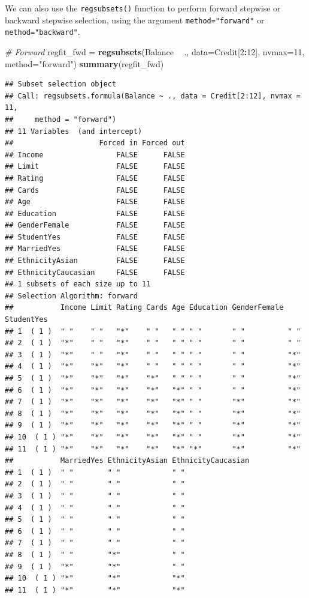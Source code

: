 \documentclass[
]{article}
\newenvironment{Shaded}{\begin{snugshade}}{\end{snugshade}}
\newcommand{\CommentTok}[1]{\textcolor[rgb]{0.56,0.35,0.01}{\textit{#1}}}
\newcommand{\DataTypeTok}[1]{\textcolor[rgb]{0.13,0.29,0.53}{#1}}
\newcommand{\DecValTok}[1]{\textcolor[rgb]{0.00,0.00,0.81}{#1}}
\newcommand{\KeywordTok}[1]{\textcolor[rgb]{0.13,0.29,0.53}{\textbf{#1}}}
\newcommand{\NormalTok}[1]{#1}
\newcommand{\OperatorTok}[1]{\textcolor[rgb]{0.81,0.36,0.00}{\textbf{#1}}}
\newcommand{\StringTok}[1]{\textcolor[rgb]{0.31,0.60,0.02}{#1}}
\begin{document}
We can also use the \texttt{regsubsets()} function to perform forward
stepwise or backward stepwise selection, using the argument
\texttt{method="forward"} or \texttt{method="backward"}.

\begin{Shaded}
\begin{Highlighting}[]
\CommentTok{# Forward}
\NormalTok{regfit_fwd =}\StringTok{ }\KeywordTok{regsubsets}\NormalTok{(Balance }\OperatorTok{~}\StringTok{ }\NormalTok{., }\DataTypeTok{data=}\NormalTok{Credit[}\DecValTok{2}\OperatorTok{:}\DecValTok{12}\NormalTok{], }\DataTypeTok{nvmax=}\DecValTok{11}\NormalTok{, }\DataTypeTok{method=}\StringTok{"forward"}\NormalTok{)}
\KeywordTok{summary}\NormalTok{(regfit_fwd)}
\end{Highlighting}
\end{Shaded}

\begin{verbatim}
## Subset selection object
## Call: regsubsets.formula(Balance ~ ., data = Credit[2:12], nvmax = 11, 
##     method = "forward")
## 11 Variables  (and intercept)
##                    Forced in Forced out
## Income                 FALSE      FALSE
## Limit                  FALSE      FALSE
## Rating                 FALSE      FALSE
## Cards                  FALSE      FALSE
## Age                    FALSE      FALSE
## Education              FALSE      FALSE
## GenderFemale           FALSE      FALSE
## StudentYes             FALSE      FALSE
## MarriedYes             FALSE      FALSE
## EthnicityAsian         FALSE      FALSE
## EthnicityCaucasian     FALSE      FALSE
## 1 subsets of each size up to 11
## Selection Algorithm: forward
##           Income Limit Rating Cards Age Education GenderFemale StudentYes
## 1  ( 1 )  " "    " "   "*"    " "   " " " "       " "          " "       
## 2  ( 1 )  "*"    " "   "*"    " "   " " " "       " "          " "       
## 3  ( 1 )  "*"    " "   "*"    " "   " " " "       " "          "*"       
## 4  ( 1 )  "*"    "*"   "*"    " "   " " " "       " "          "*"       
## 5  ( 1 )  "*"    "*"   "*"    "*"   " " " "       " "          "*"       
## 6  ( 1 )  "*"    "*"   "*"    "*"   "*" " "       " "          "*"       
## 7  ( 1 )  "*"    "*"   "*"    "*"   "*" " "       "*"          "*"       
## 8  ( 1 )  "*"    "*"   "*"    "*"   "*" " "       "*"          "*"       
## 9  ( 1 )  "*"    "*"   "*"    "*"   "*" " "       "*"          "*"       
## 10  ( 1 ) "*"    "*"   "*"    "*"   "*" " "       "*"          "*"       
## 11  ( 1 ) "*"    "*"   "*"    "*"   "*" "*"       "*"          "*"       
##           MarriedYes EthnicityAsian EthnicityCaucasian
## 1  ( 1 )  " "        " "            " "               
## 2  ( 1 )  " "        " "            " "               
## 3  ( 1 )  " "        " "            " "               
## 4  ( 1 )  " "        " "            " "               
## 5  ( 1 )  " "        " "            " "               
## 6  ( 1 )  " "        " "            " "               
## 7  ( 1 )  " "        " "            " "               
## 8  ( 1 )  " "        "*"            " "               
## 9  ( 1 )  "*"        "*"            " "               
## 10  ( 1 ) "*"        "*"            "*"               
## 11  ( 1 ) "*"        "*"            "*"
\end{verbatim}
\end{document}
